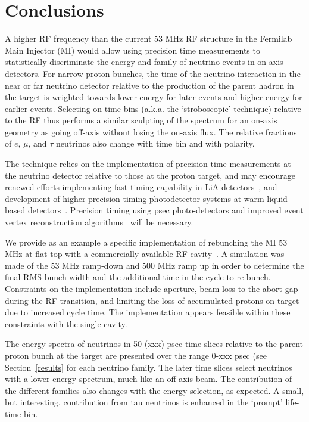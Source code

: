 
%
%
\section{Conclusions}
\label{conclusions}
A higher RF frequency than the current 53 MHz RF structure in the
Fermilab Main Injector (MI) would allow using precision time
measurements to statistically discriminate the energy and family of
neutrino events in on-axis detectors. For narrow proton bunches, the
time of the neutrino interaction in the near or far neutrino detector
relative to the production of the parent hadron in the target is
weighted towards lower energy for later events and higher energy for
earlier events. Selecting on time bins (a.k.a. the `stroboscopic'
technique) relative to the RF thus performs a similar sculpting of the
spectrum for an on-axis geometry as going off-axis without losing the
on-axis flux. The relative fractions of $e$, $\mu$, and $\tau$
neutrinos also change with time bin and with polarity. 

The technique relies on the implementation of 
precision time measurements at the neutrino
detector relative to those at the proton target, and may encourage 
renewed efforts
implementing fast timing capability in LiA
detectors~\cite{LiA_timing}, and development of higher precision timing
photodetector systems 
at warm liquid-based detectors~\cite{ANNIE, JUNO,liquid_based}. 
Precision timing using psec
photo-detectors and improved event vertex reconstruction
algorithms~\cite{vertex_reconstruction} will be necessary.

We provide as an example a specific implementation of rebunching the
MI 53 MHz at flat-top with a commercially-available RF 
cavity~\cite{nsls-cavity,cls_stampe}. A simulation was made of the 53 MHz
ramp-down and 500 MHz ramp up in order to determine the final RMS
bunch width and the additional time in the cycle to re-bunch. 
Constraints on the implementation include aperture, beam loss to the
abort gap during the RF transition, and limiting the loss of
accumulated protons-on-target due to increased cycle time. The
implementation  appears feasible within these constraints with the 
single cavity.

The energy spectra of neutrinos in 50 (xxx) psec time slices relative
to the parent proton bunch at the target are presented over the range
0-xxx psec (see Section~\ref{results} for each neutrino family. The
later time slices select neutrinos with a lower energy spectrum, much
like an off-axis beam. The contribution of the different families also
changes with the energy selection, as expected. A small, but
interesting, contribution from tau neutrinos is enhanced in the `prompt' 
life-time bin.


